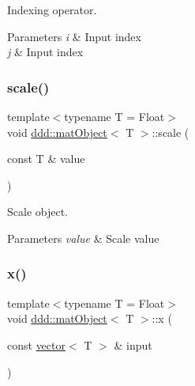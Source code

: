 Indexing operator. 


\begin{DoxyParams}{Parameters}
{\em i} & Input index \\
\hline
{\em j} & Input index \\
\hline
\end{DoxyParams}
\mbox{\label{classddd_1_1mat_object_a078f66a56b01fc18cc9864ec736611e5}} 
\subsubsection{\texorpdfstring{scale()}{scale()}}
{\footnotesize\ttfamily template$<$typename T  = Float$>$ \\
void \hyperlink{classddd_1_1mat_object}{ddd\+::mat\+Object}$<$ T $>$\+::scale (\begin{DoxyParamCaption}\item[{const T \&}]{value }\end{DoxyParamCaption})\hspace{0.3cm}{\ttfamily [inline]}}



Scale object. 


\begin{DoxyParams}{Parameters}
{\em value} & Scale value \\
\hline
\end{DoxyParams}
\mbox{\label{classddd_1_1mat_object_a9b1d7066a88e2f1b6cfb101fb783fdf6}} 
\subsubsection{\texorpdfstring{x()}{x()}}
{\footnotesize\ttfamily template$<$typename T  = Float$>$ \\
void \hyperlink{classddd_1_1mat_object}{ddd\+::mat\+Object}$<$ T $>$\+::x (\begin{DoxyParamCaption}\item[{const \hyperlink{classddd_1_1vector}{vector}$<$ T $>$ \&}]{input }\end{DoxyParamCaption})\hspace{0.3cm}{\ttfamily [inline]}}



